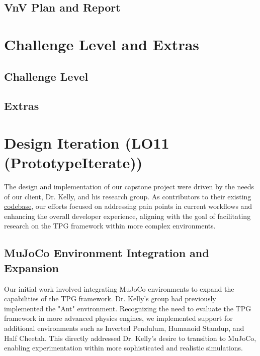 \documentclass{article}
\begin{document}
\subsection{VnV Plan and Report}

\section{Challenge Level and Extras}

\subsection{Challenge Level}


\subsection{Extras}


\section{Design Iteration (LO11 (PrototypeIterate))}

The design and implementation of our capstone project were driven by the needs of our client, Dr. Kelly, and his research group. As contributors to their existing \href{https://gitlab.cas.mcmaster.ca/kellys32/tpg}{codebase}, our efforts focused on addressing pain points in current workflows and enhancing the overall developer experience, aligning with the goal of facilitating research on the TPG framework within more complex environments.

\subsection{MuJoCo Environment Integration and Expansion}

Our initial work involved integrating MuJoCo environments to expand the capabilities of the TPG framework. Dr. Kelly's group had previously implemented the "Ant" environment. Recognizing the need to evaluate the TPG framework in more advanced physics engines, we implemented support for additional environments such as Inverted Pendulum, Humanoid Standup, and Half Cheetah. This directly addressed Dr. Kelly's desire to transition to MuJoCo, enabling experimentation within more sophisticated and realistic simulations.
\end{document}
